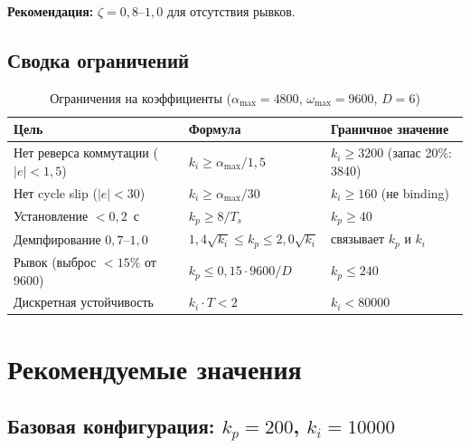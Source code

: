 \documentclass[12pt,a4paper]{article}
\begin{document}
\textbf{Рекомендация:} $\zeta = 0{,}8$--$1{,}0$ для отсутствия рывков.

\subsection{Сводка ограничений}

\begin{table}[H]
\centering
\caption{Ограничения на коэффициенты ($\alpha_\text{max}=4800$, $\omega_\text{max}=9600$, $D=6$)}
\begin{tabular}{lll}
\toprule
Цель & Формула & Граничное значение \\
\midrule
Нет реверса коммутации ($|e|<1{,}5$) & $k_i \ge \alpha_\text{max}/1{,}5$ & $k_i \ge 3200$ (запас 20\%: 3840) \\
Нет cycle slip ($|e|<30$) & $k_i \ge \alpha_\text{max}/30$ & $k_i \ge 160$ (не binding) \\
Установление $< 0{,}2$~с & $k_p \ge 8/T_s$ & $k_p \ge 40$ \\
Демпфирование $0{,}7$--$1{,}0$ & $1{,}4\sqrt{k_i} \le k_p \le 2{,}0\sqrt{k_i}$ & связывает $k_p$ и $k_i$ \\
Рывок (выброс $< 15\%$ от 9600) & $k_p \le 0{,}15 \cdot 9600/D$ & $k_p \le 240$ \\
Дискретная устойчивость & $k_i \cdot T < 2$ & $k_i < 80000$ \\
\bottomrule
\end{tabular}
\end{table}

\section{Рекомендуемые значения}

\subsection{Базовая конфигурация: $k_p = 200$, $k_i = 10000$}
\end{document}
